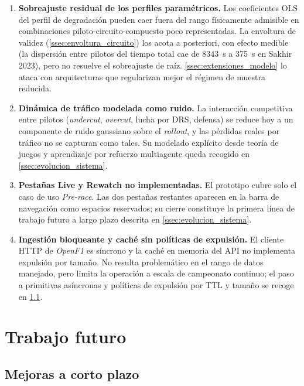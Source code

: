 \begin{enumerate}
    \item \textbf{Sobreajuste residual de los perfiles paramétricos.} Los coeficientes OLS del perfil de degradación pueden caer fuera del rango físicamente admisible en combinaciones piloto-circuito-compuesto poco representadas. La envoltura de validez (\ref{ssec:envoltura_circuito}) los acota a posteriori, con efecto medible (la dispersión entre pilotos del tiempo total cae de \SI{8343}{\second} a \SI{375}{\second} en Sakhir 2023), pero no resuelve el sobreajuste de raíz. \ref{ssec:extensiones_modelo} lo ataca con arquitecturas que regularizan mejor el régimen de muestra reducida.

    \item \textbf{Dinámica de tráfico modelada como ruido.} La interacción competitiva entre pilotos (\textit{undercut}, \textit{overcut}, lucha por DRS, defensa) se reduce hoy a un componente de ruido gaussiano sobre el \textit{rollout}, y las pérdidas reales por tráfico no se capturan como tales. Su modelado explícito desde teoría de juegos y aprendizaje por refuerzo multiagente queda recogido en \ref{ssec:evolucion_sistema}.

    \item \textbf{Pestañas Live y Rewatch no implementadas.} El prototipo cubre solo el caso de uso \textit{Pre-race}. Las dos pestañas restantes aparecen en la barra de navegación como espacios reservados; su cierre constituye la primera línea de trabajo futuro a largo plazo descrita en \ref{ssec:evolucion_sistema}.

    \item \textbf{Ingestión bloqueante y caché sin políticas de expulsión.} El cliente HTTP de \textit{OpenF1} es síncrono y la caché en memoria del API no implementa expulsión por tamaño. No resulta problemático en el rango de datos manejado, pero limita la operación a escala de campeonato continuo; el paso a primitivas asíncronas y políticas de expulsión por TTL y tamaño se recoge en \ref{ssec:mejoras_corto}.
\end{enumerate}

\section{Trabajo futuro}
\label{sec:trabajo_futuro}

\subsection{Mejoras a corto plazo}
\label{ssec:mejoras_corto}


